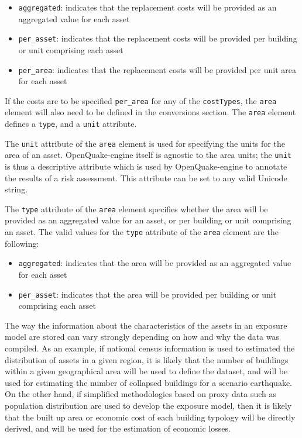 \begin{itemize}

    \item \Verb+aggregated+: indicates that the replacement costs will be 
    provided as an aggregated value for each asset 

    \item \Verb+per_asset+: indicates that the replacement costs will be 
    provided per building or unit comprising each asset

    \item \Verb+per_area+: indicates that the replacement costs will be 
    provided per unit area for each asset

\end{itemize}

If the costs are to be specified \Verb+per_area+ for any of the
\Verb+costTypes+, the \Verb+area+ element will also need to be defined in the
conversions section. The \Verb+area+ element defines a \Verb+type+, and a
\Verb+unit+ attribute.

The \Verb+unit+ attribute of the \Verb+area+ element is used for specifying
the units for the area of an asset. OpenQuake-engine itself is agnostic to the
area units; the \Verb+unit+ is thus a descriptive attribute which is used by
OpenQuake-engine to annotate the results of a risk assessment. This attribute
can be set to any valid Unicode string.

The \Verb+type+ attribute of the \Verb+area+ element specifies whether the
area will be provided as an aggregated value for an asset, or per building or
unit comprising an asset. The valid values for the \Verb+type+ attribute of
the \Verb+area+ element are the following:

\begin{itemize}

    \item \Verb+aggregated+: indicates that the area will be provided as an 
    aggregated value for each asset

    \item \Verb+per_asset+: indicates that the area will be provided per 
    building or unit comprising each asset

\end{itemize}


The way the information about the characteristics of the \glspl{asset} in an
\gls{exposure model} are stored can vary strongly depending on how and why the
data was compiled. As an example, if national census information is used to
estimated the distribution of assets in a given region, it is likely that the
number of buildings within a given geographical area will be used to define
the dataset, and will be used for estimating the number of collapsed buildings
for a scenario earthquake. On the other hand, if simplified methodologies
based on proxy data such as population distribution are used to develop the
exposure model, then it is likely that the built up area or economic cost of
each building typology will be directly derived, and will be used for the
estimation of economic losses.


